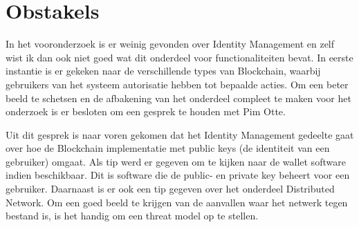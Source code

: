 \section{Obstakels}

In het vooronderzoek is er weinig gevonden over Identity Management en zelf wist ik dan ook niet goed wat dit onderdeel voor functionaliteiten bevat. In eerste instantie is er gekeken naar de verschillende types van Blockchain, waarbij gebruikers van het systeem autorisatie hebben tot bepaalde acties. Om een beter beeld te schetsen en de afbakening van het onderdeel compleet te maken voor het onderzoek is er besloten om een gesprek te houden met Pim Otte.

Uit dit gesprek is naar voren gekomen dat het Identity Management gedeelte gaat over hoe de Blockchain implementatie met public keys (de identiteit van een gebruiker) omgaat. Als tip werd er gegeven om te kijken naar de wallet software indien beschikbaar. Dit is software die de public- en private key beheert voor een gebruiker. Daarnaast is er ook een tip gegeven over het onderdeel Distributed Network. Om een goed beeld te krijgen van de aanvallen waar het netwerk tegen bestand is, is het handig om een threat model op te stellen.